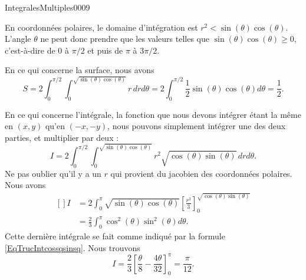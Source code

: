 \begin{corrige}{IntegralesMultiples0009}

	En coordonnées polaires, le domaine d'intégration est $r^2<\sin(\theta)\cos(\theta)$. L'angle $\theta$ ne peut donc prendre que les valeurs telles que $\sin(\theta)\cos(\theta)\geq 0$, c'est-à-dire de $0$ à $\pi/2$ et puis de $\pi$ à $3\pi/2$.

    En ce qui concerne la surface, nous avons
    \begin{equation}
        S=2\int_0^{\pi/2}\int_0^{\sqrt{\sin(\theta)\cos(\theta)}}r\,drd\theta=2\int_0^{\pi/2}\frac{ 1 }{2}\sin(\theta)\cos(\theta)d\theta=\frac{ 1 }{2}.
    \end{equation}
    
	En ce qui concerne l'intégrale, la fonction que nous devons intégrer étant la même en $(x,y)$ qu'en $(-x,-y)$, nous pouvons simplement intégrer une des deux parties, et multiplier par deux :
	\begin{equation}
        I=2\int_0^{\pi/2}\int_0^{\sqrt{\sin(\theta)\cos(\theta)}}r^2\sqrt{\cos(\theta)\sin(\theta)}\,drd\theta.
	\end{equation}
    Ne pas oublier qu'il y a un $r$ qui provient du jacobien des coordonnées polaires. Nous avons
    \begin{equation}
        \begin{aligned}[]
            I&=2\int_0^{\pi}\sqrt{\sin(\theta)\cos(\theta)}\left[ \frac{ r^3 }{ 3 } \right]_0^{\sqrt{\cos(\theta)\sin(\theta)}}\\
            &=\frac{ 2 }{ 3 }\int_0^{\pi}\cos^2(\theta)\sin^2(\theta)d\theta.
        \end{aligned}
    \end{equation}
    Cette dernière intégrale se fait comme indiqué par la formule \eqref{EqTrucIntcossqsinsq}. Nous trouvons
    \begin{equation}
        I=\frac{ 2 }{ 3 }\left[ \frac{ \theta }{ 8 }-\frac{ 4\theta }{ 32 } \right]_0^{\pi}=\frac{ \pi }{ 12 }.
    \end{equation}

\end{corrige}
